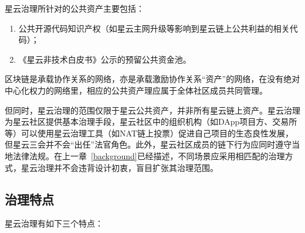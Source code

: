 星云治理所针对的公共资产主要包括：

\begin{enumerate}
	\item 公共开源代码知识产权（如星云主网升级等影响到星云链上公共利益的相关代码）；
	\item 《星云非技术白皮书》公示的预留公共资金池。
\end{enumerate}

区块链是承载协作关系的网络，亦是承载激励协作关系“资产”的网络，在没有绝对中心化权力的网络里，相应的公共资产理应属于全体社区成员共同管理。

但同时，星云治理的范围仅限于星云公共资产，并非所有星云链上资产。星云治理为星云社区提供基本治理手段，星云社区中的组织机构（如DApp项目方、交易所等）可以使用星云治理工具（如NAT链上投票）促进自己项目的生态良性发展，但星云三会并不会“出任”法官角色。此外，星云社区成员的链下行为应同时遵守当地法律法规。在上一章~\ref{background}已经描述，不同场景应采用相匹配的治理方式，星云治理并不会违背设计初衷，盲目扩张其治理范围。

\subsection{治理特点}

星云治理有如下三个特点：

